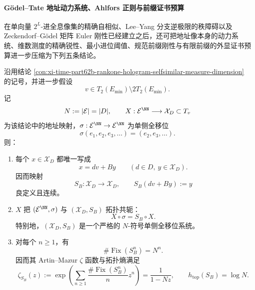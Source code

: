 \paragraph{Gödel--Tate 地址动力系统、Ahlfors 正则与前缀证书预算}
在单向量 \(2^L\)-进全息像集的精确自相似、Lee--Yang 分支逆极限的秩障碍以及 Zeckendorf--Gödel 矩阵 Euler 刚性已经建立之后，还可把地址像本身的动力系统、维数测度的精确锐性、最小进位阈值、规范前缀刚性与有限前缀的外显证书预算进一步压缩为下列五条结论。

\begin{conclusion}\label{con:xi-time-part62c-godel-tate-address-fullshift-zeta-entropy}
沿用结论 \ref{con:xi-time-part62b-rankone-hologram-selfsimilar-measure-dimension} 的记号，并进一步假设
\[
v\in T_2(E_{\min})\setminus 2T_2(E_{\min}).
\]
记
\[
N:=|\mathcal E|=|D|,
\qquad
X:\mathcal E^{\NN}\longrightarrow \mathcal X_D\subset T_v
\]
为该结论中的地址映射，\(\sigma:\mathcal E^{\NN}\to \mathcal E^{\NN}\) 为单侧全移位
\[
\sigma(e_1,e_2,e_3,\dots)=(e_2,e_3,\dots).
\]
则：
\begin{enumerate}
  \item 每个 \(x\in\mathcal X_D\) 都唯一写成
  \[
  x=dv+By
  \qquad (d\in D,\ y\in\mathcal X_D).
  \]
  因而映射
  \[
  S_B:\mathcal X_D\to \mathcal X_D,
  \qquad
  S_B(dv+By):=y
  \]
  良定义且连续。
  \item \(X\) 把 \((\mathcal E^{\NN},\sigma)\) 与 \((\mathcal X_D,S_B)\) 拓扑共轭：
  \[
  X\circ \sigma=S_B\circ X.
  \]
  特别地，\((\mathcal X_D,S_B)\) 是一个严格的 \(N\)-符号单侧全移位系统。
  \item 对每个 \(n\ge 1\)，有
  \[
  \#\operatorname{Fix}(S_B^n)=N^n.
  \]
  因而其 Artin--Mazur \(\zeta\) 函数与拓扑熵满足
  \[
  \zeta_{S_B}(z)
  :=
  \exp\!\left(\sum_{n\ge 1}\frac{\#\operatorname{Fix}(S_B^n)}{n}z^n\right)
  =
  \frac{1}{1-Nz},
  \qquad
  h_{\mathrm{top}}(S_B)=\log N.
  \]
\end{enumerate}
\end{conclusion}
